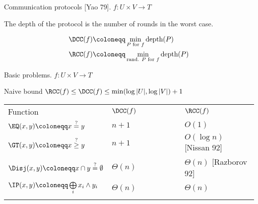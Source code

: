 \begin{frame}{Communication protocols [Yao 79]. $f: U \times V \to T$}
    \begin{center}
    	    
    \end{center}

    \pause
    \pause
    \pause
	\pause
    
    The depth of the protocol is the number of rounds in the worst case.
    
    \pause
    \begin{center}
        \begin{align*}
          \DCC(f) & \coloneqq \min\limits_{P \text{ for } f} \text{depth}(P) \\
          \RCC(f) & \coloneqq \min\limits_{\text{rand. } P \text{ for } f} \text{depth}(P)
        \end{align*}
    \end{center}
\end{frame}

\begin{frame}{Basic problems. $f: U \times V \to T$}

    \begin{block}{Naive bound}
        $\RCC(f) \le \DCC(f) \le \min(\log |U|, \log |V|) + 1$
    \end{block}

    \pause      
    \begin{tabular}{b{0.4\linewidth}b{0.3\linewidth}b{0.3\linewidth}}
      Function & $\DCC(f)$ & $\RCC(f)$ \\
      \vspace{0.1cm}
      \pause      
      $\EQ(x, y) \coloneqq x \overset{?}{=} y$ & $n + 1$ & $O(1)$ \\
      \vspace{0.1cm}
      \pause
      $\GT(x, y) \coloneqq x \overset{?}{\ge} y$ & $n + 1$ & $O(\log n)$ [Nissan 92] \\
      \vspace{0.1cm}
      \pause
      $\Disj(x, y) \coloneqq x \cap y \overset{?}{=} \emptyset$ & $\Theta(n)$ &
                                                                                $\Theta(n)$ [Razborov 92] \\
            \pause
      $\IP(x, y) \coloneqq  \bigoplus\limits_i x_i \land y_i$ & $\Theta(n)$ & $\Theta(n)$ \\
      \vspace{0.1cm}
    \end{tabular}
\end{frame}

